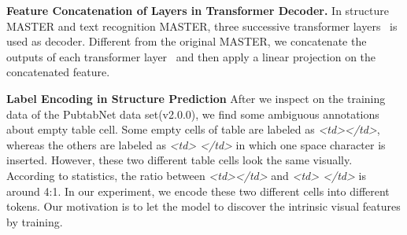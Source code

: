 \documentclass{article}
\begin{document}
{\bf{Feature Concatenation of Layers in Transformer Decoder.}}
In structure MASTER and text recognition MASTER, three successive transformer layers~\cite{lu2019master} is used as decoder. Different from the original MASTER, we concatenate the outputs of each transformer layer~\cite{dou2018exploiting} and then apply a linear projection on the concatenated feature.



{\bf{Label Encoding in Structure Prediction}}
After we inspect on the training data of the PubtabNet data set(v2.0.0), we find some ambiguous annotations about empty table cell. Some empty cells of table are labeled as \emph{<td></td>}, whereas the others are labeled as \emph{<td> </td>} in which one space character is inserted. However, these two different table cells look the same visually. According to statistics, the ratio between \emph{<td></td>} and \emph{<td> </td>} is around 4:1. In our experiment, we encode these two different cells into different tokens. Our motivation is to let the model to discover the intrinsic visual features by training. 
\end{document}
